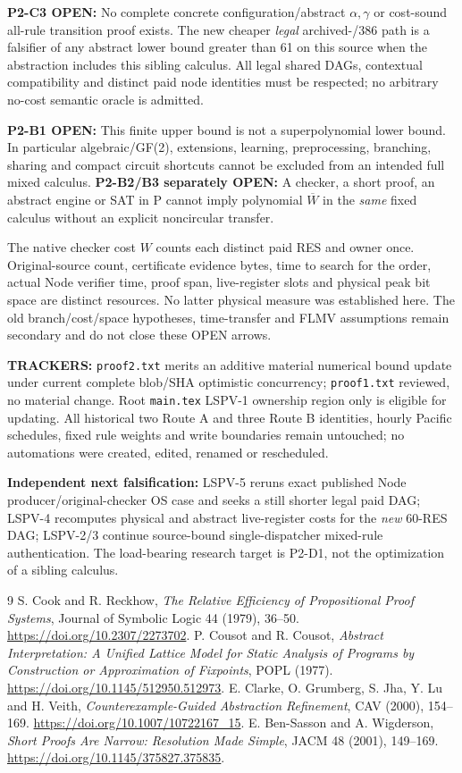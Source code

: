 \documentclass[11pt]{article}
\begin{document}
\textbf{P2-C3 OPEN:} No complete concrete configuration/abstract $\alpha,\gamma$ or cost-sound all-rule transition proof exists. The new cheaper \emph{legal} archived-/386 path is a falsifier of any abstract lower bound greater than 61 on this source when the abstraction includes this sibling calculus. All legal shared DAGs, contextual compatibility and distinct paid node identities must be respected; no arbitrary no-cost semantic oracle is admitted.

\textbf{P2-B1 OPEN:} This finite upper bound is not a superpolynomial lower bound. In particular algebraic/GF(2), extensions, learning, preprocessing, branching, sharing and compact circuit shortcuts cannot be excluded from an intended full mixed calculus. \textbf{P2-B2/B3 separately OPEN:} A checker, a short proof, an abstract engine or SAT in P cannot imply polynomial $\overline W$ in the \emph{same} fixed calculus without an explicit noncircular transfer.

The native checker cost $W$ counts each distinct paid RES and owner once. Original-source count, certificate evidence bytes, time to search for the order, actual Node verifier time, proof span, live-register slots and physical peak bit space are distinct resources. No latter physical measure was established here. The old branch/cost/space hypotheses, time-transfer and FLMV assumptions remain secondary and do not close these OPEN arrows.

\textbf{TRACKERS:} \texttt{proof2.txt} merits an additive material numerical bound update under current complete blob/SHA optimistic concurrency; \texttt{proof1.txt} reviewed, no material change. Root \texttt{main.tex} LSPV-1 ownership region only is eligible for updating. All historical two Route A and three Route B identities, hourly Pacific schedules, fixed rule weights and write boundaries remain untouched; no automations were created, edited, renamed or rescheduled.

\textbf{Independent next falsification:} LSPV-5 reruns exact published Node producer/original-checker OS case and seeks a still shorter legal paid DAG; LSPV-4 recomputes physical and abstract live-register costs for the \emph{new} 60-RES DAG; LSPV-2/3 continue source-bound single-dispatcher mixed-rule authentication. The load-bearing research target is P2-D1, not the optimization of a sibling calculus.

\begin{thebibliography}{9}
 S. Cook and R. Reckhow, \emph{The Relative Efficiency of Propositional Proof Systems}, Journal of Symbolic Logic 44 (1979), 36--50. \url{https://doi.org/10.2307/2273702}.
 P. Cousot and R. Cousot, \emph{Abstract Interpretation: A Unified Lattice Model for Static Analysis of Programs by Construction or Approximation of Fixpoints}, POPL (1977). \url{https://doi.org/10.1145/512950.512973}.
 E. Clarke, O. Grumberg, S. Jha, Y. Lu and H. Veith, \emph{Counterexample-Guided Abstraction Refinement}, CAV (2000), 154--169. \url{https://doi.org/10.1007/10722167_15}.
 E. Ben-Sasson and A. Wigderson, \emph{Short Proofs Are Narrow: Resolution Made Simple}, JACM 48 (2001), 149--169. \url{https://doi.org/10.1145/375827.375835}.
\end{thebibliography}
\end{document}
